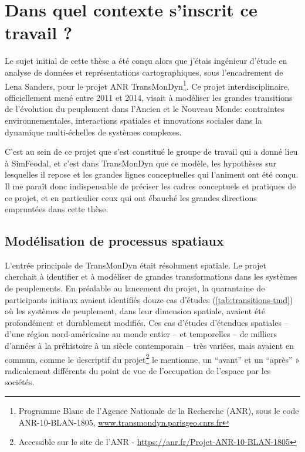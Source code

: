 \section{Dans quel contexte s'inscrit ce travail ?}

Le sujet initial de cette thèse a été conçu alors que j'étais ingénieur d'étude en analyse de données et représentations cartographiques, sous l'encadrement de Lena Sanders, pour le projet ANR TransMonDyn\footnote{
Programme \og Blanc\fg{} de l'Agence Nationale de la Recherche (ANR), sous le code \mbox{ANR-10-BLAN-1805},  \href{http://www.transmondyn.parisgeo.cnrs.fr/}{www.transmondyn.parisgeo.cnrs.fr}
}.
Ce projet interdisciplinaire, officiellement mené entre 2011 et 2014, visait à \og modéliser les grandes transitions de l'évolution du peuplement dans l'Ancien et le Nouveau Monde: contraintes environnementales, interactions spatiales et innovations sociales dans la dynamique multi-échelles de systèmes complexes\fg{}.

C'est au sein de ce projet que s'est constitué le groupe de travail qui a donné lieu à SimFeodal, et c'est dans TransMonDyn que ce modèle, les hypothèses sur lesquelles il repose et les grandes lignes conceptuelles qui l'animent ont été conçu.
Il me paraît donc indispensable de préciser les cadres conceptuels et pratiques de ce projet, et en particulier ceux qui ont ébauché les grandes directions empruntées dans cette thèse.

\subsection{Modélisation de processus spatiaux}

L'entrée principale de TransMonDyn était résolument spatiale.
Le projet cherchait à identifier et à modéliser de grandes transformations dans les systèmes de peuplements.
En préalable au lancement du projet, la quarantaine de participants initiaux avaient identifiés douze cas d'études (\cref{tab:transitions-tmd}) où les systèmes de peuplement, dans leur dimension spatiale, avaient été profondément et durablement modifiés.
Ces cas d'études d'étendues spatiales -- d'une région nord-américaine au monde entier -- et temporelles -- de milliers d'années à la préhistoire à un siècle contemporain -- très variées, mais avaient en commun, comme le descriptif du projet\footnote{
	Accessible sur le site de l'ANR -  \href{https://anr.fr/Projet-ANR-10-BLAN-1805}{https://anr.fr/Projet-ANR-10-BLAN-1805}
} le mentionne, \og un “avant” et un “après” » radicalement différents du point de vue de l’occupation de l’espace par les sociétés.\fg{}

